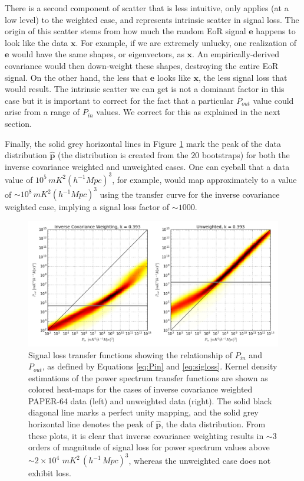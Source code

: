 \documentclass[preprint2,numberedappendix,tighten]{aastex6}  %
\begin{document}
There is a second component of scatter that is less intuitive, only applies (at a low level) to the weighted case, and represents intrinsic scatter in signal loss. The origin of this scatter stems from how much the random EoR signal $\textbf{e}$ happens to look like the data $\textbf{x}$. For example, if we are extremely unlucky, one realization of $\textbf{e}$ would have the same shapes, or eigenvectors, as $\textbf{x}$. An empirically-derived covariance would then down-weight these shapes, destroying the entire EoR signal. On the other hand, the less that $\textbf{e}$ looks like $\textbf{x}$, the less signal loss that would result. The intrinsic scatter we can get is not a dominant factor in this case but it is important to correct for the fact that a particular $P_{out}$ value could arise from a range of $P_{in}$ values. We correct for this as explained in the next section.

Finally, the solid grey horizontal lines in Figure \ref{fig:sigloss_transfercurve} mark the peak of the data distribution $\hat{\textbf{p}}$ (the distribution is created from the $20$ bootstraps) for both the inverse covariance weighted and unweighted cases. One can eyeball that a data value of $10^{5} \, mK^{2} (h^{-1} Mpc)^{3}$, for example, would map approximately to a value of $\sim10^{8} \, mK^{2} (h^{-1} Mpc)^{3}$ using the transfer curve for the inverse covariance weighted case, implying a signal loss factor of $\sim1000$. 

\begin{figure}
	\centering
	\includegraphics[width=1\textwidth]{plots/sigloss_transfercurve.png}
	\caption{Signal loss transfer functions showing the relationship of $P_{in}$ and $P_{out}$, as defined by Equations \eqref{eq:Pin} and \eqref{eq:sigloss}. Kernel density estimations of the power spectrum transfer functions are shown as colored heat-maps for the cases of inverse covariance weighted PAPER-64 data (left) and unweighted data (right). The solid black diagonal line marks a perfect unity mapping, and the solid grey horizontal line denotes the peak of $\hat{\textbf{p}}$, the data distribution. From these plots, it is clear that inverse covariance weighting results in $\sim3$ orders of magnitude of signal loss for power spectrum values above $\sim$$2 \times 10^{4}$ $mK^{2} \, (h^{-1} \, Mpc)^{3}$, whereas the unweighted case does not exhibit loss.}
	\label{fig:sigloss_transfercurve}
\end{figure}
\end{document}
